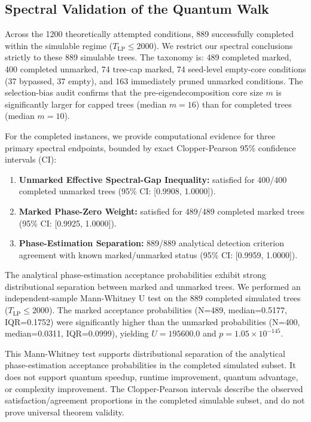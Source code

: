 \documentclass[conference]{IEEEtran} \IEEEoverridecommandlockouts
\begin{document}
\subsection{Spectral Validation of the Quantum Walk}
Across the 1200 theoretically attempted conditions, 889 successfully completed within the simulable regime ($T_{\text{LP}} \le 2000$). We restrict our spectral conclusions strictly to these 889 simulable trees. The taxonomy is: 489 completed marked, 400 completed unmarked, 74 tree-cap marked, 74 seed-level empty-core conditions (37 bypassed, 37 empty), and 163 immediately pruned unmarked conditions. The selection-bias audit confirms that the pre-eigendecomposition core size $m$ is significantly larger for capped trees (median $m=16$) than for completed trees (median $m=10$).

For the completed instances, we provide computational evidence for three primary spectral endpoints, bounded by exact Clopper-Pearson 95\% confidence intervals (CI):
\begin{enumerate}
    \item \textbf{Unmarked Effective Spectral-Gap Inequality:} satisfied for 400/400 completed unmarked trees (95\% CI: [0.9908, 1.0000]).
    \item \textbf{Marked Phase-Zero Weight:} satisfied for 489/489 completed marked trees (95\% CI: [0.9925, 1.0000]).
    \item \textbf{Phase-Estimation Separation:} 889/889 analytical detection criterion agreement with known marked/unmarked status (95\% CI: [0.9959, 1.0000]).
\end{enumerate}

The analytical phase-estimation acceptance probabilities exhibit strong distributional separation between marked and unmarked trees. We performed an independent-sample Mann-Whitney U test on the 889 completed simulated trees ($T_{\text{LP}} \le 2000$). The marked acceptance probabilities (N=489, median=0.5177, IQR=0.1752) were significantly higher than the unmarked probabilities (N=400, median=0.0311, IQR=0.0999), yielding $U = 195600.0$ and $p = 1.05\times 10^{-145}$.

This Mann-Whitney test supports distributional separation of the analytical phase-estimation acceptance probabilities in the completed simulated subset. It does not support quantum speedup, runtime improvement, quantum advantage, or complexity improvement. The Clopper-Pearson intervals describe the observed satisfaction/agreement proportions in the completed simulable subset, and do not prove universal theorem validity.
\end{document}
